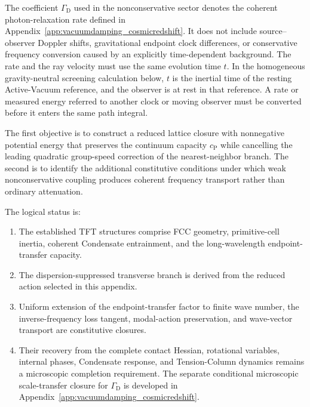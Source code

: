 The coefficient \(\Gamma_{\mathrm D}\) used in the nonconservative sector
denotes the coherent photon-relaxation rate defined in
Appendix~\ref{app:vacuumdamping_cosmicredshift}. It does not include
source--observer Doppler shifts, gravitational endpoint clock differences, or
conservative frequency conversion caused by an explicitly time-dependent
background. The rate and the ray velocity must use the same evolution time
\(t\). In the homogeneous gravity-neutral screening calculation below,
\(t\) is the inertial time of the resting Active-Vacuum reference, and the
observer is at rest in that reference. A rate or measured energy referred to
another clock or moving observer must be converted before it enters the
same path integral.

The first objective is to construct a reduced lattice closure with
nonnegative potential energy that preserves the continuum capacity
\(c_{\mathrm P}\) while cancelling the leading quadratic group-speed
correction of the nearest-neighbor branch. The second is to identify the
additional constitutive conditions under which weak nonconservative coupling
produces coherent frequency transport rather than ordinary attenuation.

The logical status is:

\begin{enumerate}
    \item The established TFT structures comprise FCC geometry,
    primitive-cell inertia, coherent Condensate entrainment, and the
    long-wavelength endpoint-transfer capacity.

    \item The dispersion-suppressed transverse branch is derived from the
    reduced action selected in this appendix.

    \item Uniform extension of the endpoint-transfer factor to finite wave
    number, the inverse-frequency loss tangent, modal-action preservation, and
    wave-vector transport are constitutive closures.

    \item Their recovery from the complete contact Hessian, rotational
    variables, internal phases, Condensate response, and Tension-Column
    dynamics remains a microscopic completion requirement. The separate
    conditional microscopic scale-transfer closure for \(\Gamma_{\mathrm D}\)
    is developed in
    Appendix~\ref{app:vacuumdamping_cosmicredshift}.
\end{enumerate}

